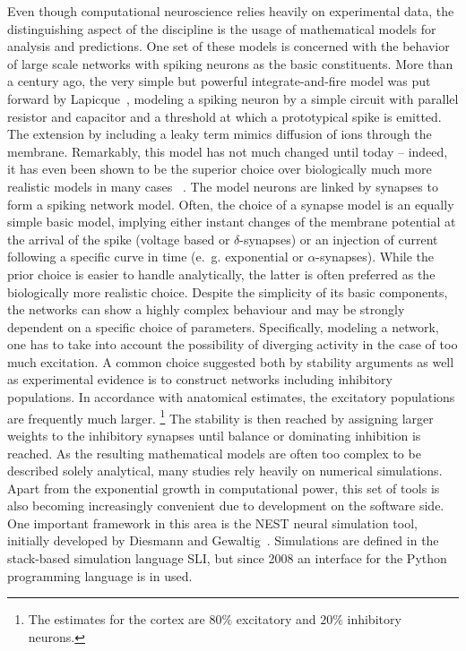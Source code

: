 Even though computational neuroscience relies heavily on experimental data, the distinguishing 
aspect of the discipline is the usage of mathematical models for analysis and predictions. 
One set of these models is concerned with the behavior of large scale networks with spiking 
neurons as the basic constituents. More than a century ago, the very simple but powerful
integrate-and-fire model was put forward by Lapicque~\cite{lapicque1907recherches}, 
modeling a spiking neuron by a simple circuit 
with parallel resistor and capacitor and a threshold at which a prototypical spike 
is emitted. The extension by including a leaky term 
mimics diffusion of ions through the membrane.
Remarkably, this model has not much changed until today -- indeed, it has even been shown 
to be the superior choice over biologically much more realistic models in many cases%
~\cite{brette2015most}.
The model neurons are linked by synapses to form a spiking network model. Often, the choice 
of a synapse model is an equally simple basic model, implying either instant changes 
of the membrane potential at the arrival of the spike (voltage based or $\delta$-synapses) or an
injection of current following a specific curve in time (e.~g. exponential or $\alpha$-synapses). 
While the prior choice is easier to handle analytically, the latter is often preferred as the 
biologically more realistic choice. 
Despite the simplicity of its basic components, the networks can show a highly complex behaviour
and may be strongly dependent on a specific choice of parameters. 
Specifically, modeling a network, one has to take into account the possibility of 
diverging activity in the case of too much excitation. A common choice suggested both 
by stability arguments as well as experimental evidence is to construct networks 
including inhibitory populations. In accordance with anatomical estimates, 
the excitatory populations are frequently much larger.%
\footnote{
    The estimates for the cortex are $80 \%$ excitatory and $20 \%$ inhibitory neurons.\cite{brunel2000}
}
The stability is then reached 
by assigning larger weights to the inhibitory synapses until balance or dominating inhibition
is reached. 
As the resulting mathematical models are often too complex to be described 
solely analytical, many studies rely heavily on numerical simulations. 
Apart from the exponential growth in computational power, this set of tools is 
also becoming increasingly convenient due to development on the software side. 
One important framework in this area is the NEST neural simulation tool, initially developed
by Diesmann and Gewaltig~\cite{NEST}. Simulations are defined in the stack-based simulation 
language SLI, but since 2008 an interface for the Python programming language%
\cite{python} is in used.

